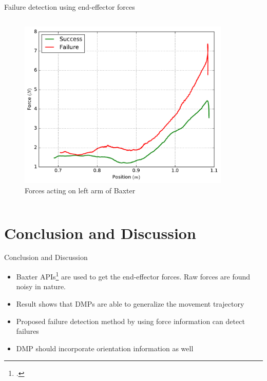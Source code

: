 \documentclass[aspectratio=43,11pt,xcolor={dvipsnames}]{beamer}
\begin{document}
\begin{frame}{Failure detection using end-effector forces}
\begin{columns}[t]
		\begin{column}{0.5\textwidth}
			\begin{figure}
				\includegraphics[width=0.9\textwidth]{position_force}
				\caption{Forces acting on left arm of Baxter}
			\end{figure}
		\end{column}
	\end{columns}
\end{frame}

\section{Conclusion and Discussion}
\begin{frame}{Conclusion and Discussion}
	\linespread{1.5}
		
	\begin{itemize}
		\item Baxter APIs\footcite{fitzgerald2013developing} are used to get the end-effector forces. Raw forces are found noisy in nature.
		\item Result shows that DMPs are able to generalize the movement trajectory
		\item Proposed failure detection method by using force information can detect failures
		\item DMP should incorporate orientation information as well
	\end{itemize}
\end{frame}
\end{document}
